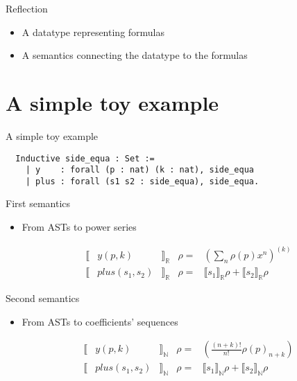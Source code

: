 \documentclass{beamer}
\newcommand{\N}{\mathbb{N}}
\newcommand{\R}{\mathbb{R}}
\begin{document}
\begin{frame}{Reflection}
\begin{itemize}
  \item A datatype representing formulas
  \item A semantics connecting the datatype to the formulas
\end{itemize}
\end{frame}

\section{A simple toy example}

\begin{frame}[fragile]{A simple toy example}
\begin{verbatim}
  Inductive side_equa : Set :=
    | y    : forall (p : nat) (k : nat), side_equa
    | plus : forall (s1 s2 : side_equa), side_equa.
\end{verbatim}
\end{frame}

\begin{frame}{First semantics}

\begin{itemize}
  \item From ASTs to power series

$$\begin{array}{lcrcl}
\llbracket & y (p, k) & \rrbracket_\R & \rho = & \left(\sum_n \rho(p) x^n\right)^{(k)}\\
\llbracket & plus(s_1,s_2) & \rrbracket_\R & \rho = & \llbracket s_1 \rrbracket_\R \rho + \llbracket s_2 \rrbracket_\R \rho
\end{array}$$
\end{itemize}
\end{frame}

\begin{frame}{Second semantics}
\begin{itemize}
  \item From ASTs to coefficients' sequences

$$\begin{array}{lcrcl}
\llbracket & y (p, k) & \rrbracket_\N & \rho = & \left(\frac{(n + k)!}{n!} \rho(p)_{n+k}\right)\\
\llbracket & plus(s_1,s_2) & \rrbracket_\N & \rho = & \llbracket s_1 \rrbracket_\N \rho + \llbracket s_2 \rrbracket_\N \rho
\end{array}$$
\end{itemize}
\end{frame}
\end{document}
